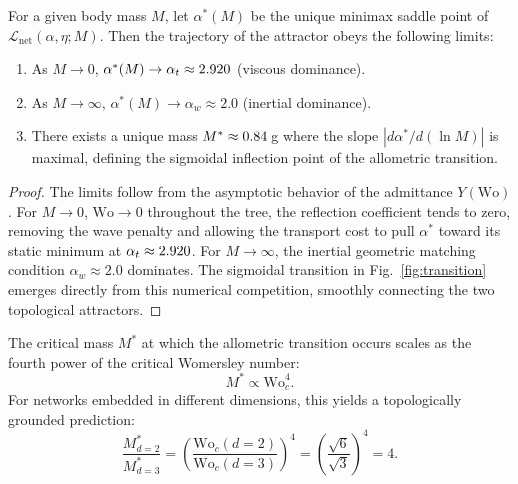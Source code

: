 \begin{theorem}
\label{thm:emergent_transition}
For a given body mass $M$, let $\alpha^*(M)$ be the unique minimax saddle point
of $\mathcal{L}_{\mathrm{net}}(\alpha,\eta; M)$. Then the trajectory of the
attractor obeys the following limits:
\begin{enumerate}
    \item
As $M\to 0$, $\alpha^*(M) \to \alpha_t \approx 2.920$ (viscous
dominance).
    \item
As $M\to\infty$, $\alpha^*(M) \to \alpha_w \approx 2.0$ (inertial dominance).
    \item
There exists a unique mass $M^* \approx 0.84\,$g where the slope
$|d\alpha^*/d(\ln M)|$ is maximal, defining the sigmoidal inflection point of
the allometric transition.
\end{enumerate}
\end{theorem}

\begin{proof}
The limits follow from the asymptotic behavior of the admittance
$Y(\mathrm{Wo})$. For $M\to 0$, $\mathrm{Wo}\to 0$ throughout the tree, the
reflection coefficient tends to zero, removing the wave penalty and allowing the
transport cost to pull $\alpha^*$ toward its static minimum at $\alpha_t \approx
2.920$. For $M\to\infty$, the inertial geometric matching condition
$\alpha_w \approx 2.0$ dominates. The sigmoidal transition in
Fig.~\ref{fig:transition} emerges directly from this numerical competition,
smoothly connecting the two topological attractors.
\end{proof}

\begin{corollary}
\label{cor:fourth_power}
The critical mass $M^*$ at which the allometric transition occurs scales as the
fourth power of the critical Womersley number:
\begin{equation}
    M^* \propto \mathrm{Wo}_c^4.
    \label{eq:fourth_power}
\end{equation}
For networks embedded in different dimensions, this yields a topologically
grounded prediction:
\begin{equation}
    \frac{M^*_{d=2}}{M^*_{d=3}} = \left(\frac{\mathrm{Wo}_c(d{=}2)}{\mathrm{Wo}_c(d{=}3)}\right)^4
    = \left(\frac{\sqrt{6}}{\sqrt{3}}\right)^4 = 4.
    \label{eq:dimension_ratio}
\end{equation}
\end{corollary}

